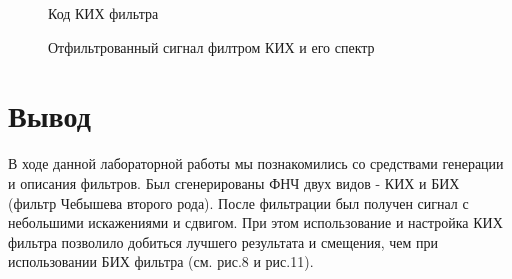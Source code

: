 \documentclass[12pt,a4paper]{scrartcl}
\begin{document}
\begin{figure}[h!]
\caption{Код КИХ фильтра}
\end{figure}

\begin{figure}[h!]
\caption{Отфильтрованный сигнал филтром КИХ и его спектр}
\end{figure}

\clearpage
\newpage

\section{Вывод}
\label{sec:afterWork}
В ходе данной лабораторной работы мы познакомились со средствами генерации и описания фильтров. Был сгенерированы ФНЧ двух видов - КИХ и БИХ (фильтр Чебышева второго рода).
После фильтрации был получен сигнал с небольшими искажениями и сдвигом. При этом использование и настройка КИХ фильтра позволило добиться лучшего результата и смещения, чем при использовании БИХ фильтра (см. рис.8 и рис.11).
\end{document}

